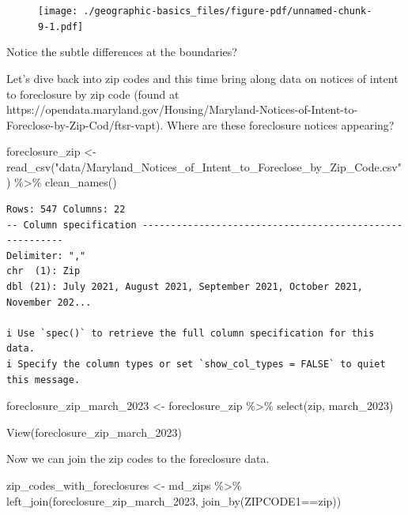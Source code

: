 \documentclass[
  letterpaper,
  DIV=11,
  numbers=noendperiod]{scrreprt}
\newenvironment{Shaded}{\begin{snugshade}}{\end{snugshade}}
\newcommand{\FunctionTok}[1]{\textcolor[rgb]{0.28,0.35,0.67}{#1}}
\newcommand{\NormalTok}[1]{\textcolor[rgb]{0.00,0.23,0.31}{#1}}
\newcommand{\OtherTok}[1]{\textcolor[rgb]{0.00,0.23,0.31}{#1}}
\newcommand{\SpecialCharTok}[1]{\textcolor[rgb]{0.37,0.37,0.37}{#1}}
\newcommand{\StringTok}[1]{\textcolor[rgb]{0.13,0.47,0.30}{#1}}
\begin{document}
\begin{figure}[H]

{\centering \texttt{[image: ./geographic-basics\_files/figure-pdf/unnamed-chunk-9-1.pdf]}

}

\end{figure}

Notice the subtle differences at the boundaries?

Let's dive back into zip codes and this time bring along data on notices
of intent to foreclosure by zip code (found at
https://opendata.maryland.gov/Housing/Maryland-Notices-of-Intent-to-Foreclose-by-Zip-Cod/ftsr-vapt).
Where are these foreclosure notices appearing?

\begin{Shaded}
\begin{Highlighting}[]
\NormalTok{foreclosure\_zip }\OtherTok{\textless{}{-}} \FunctionTok{read\_csv}\NormalTok{(}\StringTok{"data/Maryland\_Notices\_of\_Intent\_to\_Foreclose\_by\_Zip\_Code.csv"}\NormalTok{) }\SpecialCharTok{\%\textgreater{}\%} \FunctionTok{clean\_names}\NormalTok{()}
\end{Highlighting}
\end{Shaded}

\begin{verbatim}
Rows: 547 Columns: 22
-- Column specification --------------------------------------------------------
Delimiter: ","
chr  (1): Zip
dbl (21): July 2021, August 2021, September 2021, October 2021, November 202...

i Use `spec()` to retrieve the full column specification for this data.
i Specify the column types or set `show_col_types = FALSE` to quiet this message.
\end{verbatim}

\begin{Shaded}
\begin{Highlighting}[]
\NormalTok{foreclosure\_zip\_march\_2023 }\OtherTok{\textless{}{-}}\NormalTok{ foreclosure\_zip }\SpecialCharTok{\%\textgreater{}\%} 
  \FunctionTok{select}\NormalTok{(zip, march\_2023)}

\FunctionTok{View}\NormalTok{(foreclosure\_zip\_march\_2023)}
\end{Highlighting}
\end{Shaded}

Now we can join the zip codes to the foreclosure data.

\begin{Shaded}
\begin{Highlighting}[]
\NormalTok{zip\_codes\_with\_foreclosures }\OtherTok{\textless{}{-}}\NormalTok{ md\_zips }\SpecialCharTok{\%\textgreater{}\%} \FunctionTok{left\_join}\NormalTok{(foreclosure\_zip\_march\_2023, }\FunctionTok{join\_by}\NormalTok{(ZIPCODE1}\SpecialCharTok{==}\NormalTok{zip))}
\end{Highlighting}
\end{Shaded}
\end{document}

